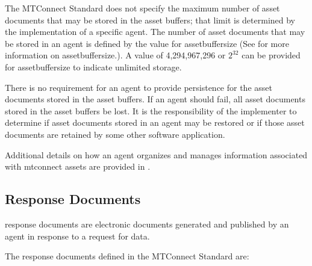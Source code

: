 The MTConnect Standard does not specify the maximum number of \glspl{asset document} that may be stored in the \glspl{asset buffer}; that limit is determined by the implementation of a specific \gls{agent}.  The number of \glspl{asset document} that may be stored in an \gls{agent} is defined by the value for \gls{assetbuffersize} (See  for more information on \gls{assetbuffersize}.).  A value of 4,294,967,296 or $2^{32}$ can be provided for \gls{assetbuffersize} to indicate unlimited storage.

There is no requirement for an \gls{agent} to provide persistence for the \glspl{asset document} stored in the \glspl{asset buffer}.  If an \gls{agent} should fail, all \glspl{asset document} stored in the \glspl{asset buffer} \MAY be lost.  It is the responsibility of the implementer to determine if \glspl{asset document} stored in an \gls{agent} may be restored or if those \glspl{asset document} are retained by some other software application.

Additional details on how an \gls{agent} organizes and manages information associated with \glspl{mtconnect asset} are provided in . 

\subsection{Response Documents}

\glspl{response document} are electronic documents generated and published by an \gls{agent} in response to a \gls{request} for data. 

The \glspl{response document} defined in the MTConnect Standard are:

